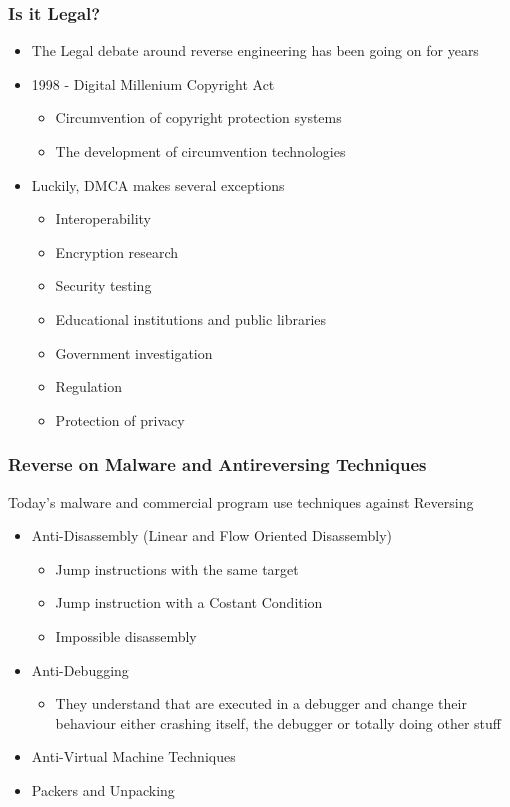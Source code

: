 \documentclass[]{beamer}
\begin{document}
		\begin{frame}
			\frametitle{Is it Legal?}
			\begin{itemize}
				\item{The Legal debate around reverse engineering has been going on for years}
				\item{1998 -  Digital Millenium Copyright Act}
					\begin{itemize}
						\item{Circumvention of copyright protection systems}
						\item{The development of circumvention technologies}
					\end{itemize}
				\item{Luckily, DMCA makes several exceptions}
					\begin{itemize}
						\item{Interoperability}
						\item{Encryption research}
						\item{Security testing}
						\item{Educational institutions and public libraries}
						\item{Government investigation}
						\item{Regulation}
						\item{Protection of privacy}
					\end{itemize}
			\end{itemize}
		\end{frame}
		\begin{frame}
			\frametitle{Reverse on Malware and Antireversing Techniques}
			Today's malware and commercial program use techniques against Reversing
			\begin{itemize}
				\item{Anti-Disassembly (Linear and Flow Oriented Disassembly)}
					\begin{itemize}
						\item{Jump instructions with the same target}
						\item{Jump instruction with a Costant Condition}
						\item{Impossible disassembly}
					\end{itemize}
				\item{Anti-Debugging}
					\begin{itemize}
						\item{They understand that are executed in a debugger and change their behaviour either crashing itself, the debugger or totally doing other stuff}
					\end{itemize}
				\item{Anti-Virtual Machine Techniques}
				\item{Packers and Unpacking}
			\end{itemize}
		\end{frame}
\end{document}
